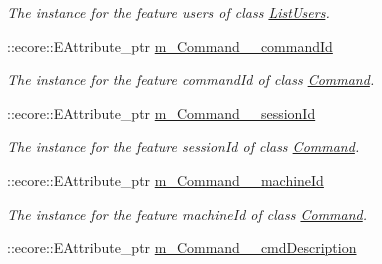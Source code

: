 \begin{DoxyCompactItemize}
\begin{DoxyCompactList}\small\item\em The instance for the feature users of class \hyperlink{classUMS__Data_1_1ListUsers}{ListUsers}. \item\end{DoxyCompactList}\item 
\hypertarget{classUMS__Data_1_1UMS__DataPackage_a451a5d5b044989cbeb32752209d9db12}{
::ecore::EAttribute\_\-ptr \hyperlink{classUMS__Data_1_1UMS__DataPackage_a451a5d5b044989cbeb32752209d9db12}{m\_\-Command\_\-\_\-commandId}}
\label{classUMS__Data_1_1UMS__DataPackage_a451a5d5b044989cbeb32752209d9db12}

\begin{DoxyCompactList}\small\item\em The instance for the feature commandId of class \hyperlink{classUMS__Data_1_1Command}{Command}. \item\end{DoxyCompactList}\item 
\hypertarget{classUMS__Data_1_1UMS__DataPackage_a5c3b41290716aeca366e4005bced9a26}{
::ecore::EAttribute\_\-ptr \hyperlink{classUMS__Data_1_1UMS__DataPackage_a5c3b41290716aeca366e4005bced9a26}{m\_\-Command\_\-\_\-sessionId}}
\label{classUMS__Data_1_1UMS__DataPackage_a5c3b41290716aeca366e4005bced9a26}

\begin{DoxyCompactList}\small\item\em The instance for the feature sessionId of class \hyperlink{classUMS__Data_1_1Command}{Command}. \item\end{DoxyCompactList}\item 
\hypertarget{classUMS__Data_1_1UMS__DataPackage_aa4c0cd261f0052f22ea73f15a53cfbc7}{
::ecore::EAttribute\_\-ptr \hyperlink{classUMS__Data_1_1UMS__DataPackage_aa4c0cd261f0052f22ea73f15a53cfbc7}{m\_\-Command\_\-\_\-machineId}}
\label{classUMS__Data_1_1UMS__DataPackage_aa4c0cd261f0052f22ea73f15a53cfbc7}

\begin{DoxyCompactList}\small\item\em The instance for the feature machineId of class \hyperlink{classUMS__Data_1_1Command}{Command}. \item\end{DoxyCompactList}\item 
\hypertarget{classUMS__Data_1_1UMS__DataPackage_ac5e02fc7ea6845ccc52ab82124738c37}{
::ecore::EAttribute\_\-ptr \hyperlink{classUMS__Data_1_1UMS__DataPackage_ac5e02fc7ea6845ccc52ab82124738c37}{m\_\-Command\_\-\_\-cmdDescription}}
\label{classUMS__Data_1_1UMS__DataPackage_ac5e02fc7ea6845ccc52ab82124738c37}


\end{DoxyCompactItemize}
